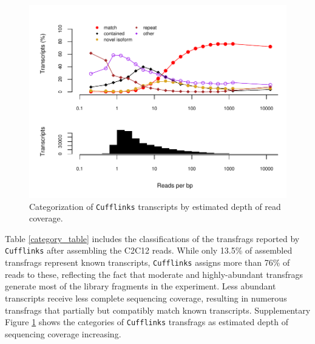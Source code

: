 \documentclass[12pt]{amsart}
\theoremstyle{definition}
\begin{document}
\begin{figure}[h] 
    \includegraphics{pdfs/categories.pdf}
    \caption[Categorization of {\tt Cufflinks} transcripts by estimated depth of read coverage]{Categorization of {\tt Cufflinks} transcripts by estimated depth of read coverage. \label{categories}}
\end{figure}

Table \ref{category_table} includes the classifications of the transfrags
reported by {\tt Cufflinks} after assembling the C2C12 reads. While only
13.5\% of assembled transfrags represent known transcripts, {\tt Cufflinks}
assigns more than 76\% of reads to these, reflecting the fact that moderate
and highly-abundant transfrags generate most of the library fragments in the
experiment. Less abundant transcripts receive less complete sequencing
coverage, resulting in numerous transfrags that partially but compatibly match
known transcripts. Supplementary Figure \ref{categories} shows the categories
of {\tt Cufflinks} transfrags as estimated depth of sequencing coverage
increasing.
\end{document}
